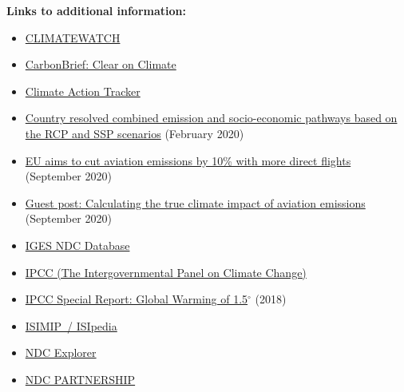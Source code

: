 \documentclass[12pt]{article}
\begin{document}
 \noindent \textbf{Links to additional information:}
 \begin{itemize}
 \item \href{https://www.climatewatchdata.org/}{CLIMATEWATCH} 
 \vspace{-.2cm} \item \href{https://www.carbonbrief.org/}{CarbonBrief: Clear on Climate} 
 \vspace{-.2cm} \item \href{https://climateactiontracker.org/}{Climate Action Tracker} 
 \vspace{-.2cm} \item \href{https://zenodo.org/record/3638137#.X2sqPIuxU2w}{Country resolved combined emission and socio-economic pathways based on the RCP and SSP scenarios} (February 2020)
 \vspace{-.2cm} \item \href{https://uk.reuters.com/article/us-airlines-eu/eu-aims-to-cut-aviation-emissions-by-10-with-more-direct-flights-idUKKCN26D1KS?utm_campaign=Carbon%20Brief%20Daily%20Briefing&utm_medium=email&utm_source=Revue%20newsletter}{EU aims to cut aviation emissions by 10\% with more direct flights} (September 2020)
 \vspace{-.2cm} \item \href{https://www.carbonbrief.org/guest-post-calculating-the-true-climate-impact-of-aviation-emissions?utm_campaign=Carbon%20Brief%20Daily%20Briefing&utm_medium=email&utm_source=Revue%20newsletter}{Guest post: Calculating the true climate impact of aviation emissions} (September 2020)
 \vspace{-.2cm} \item \href{https://www.iges.or.jp/en/pub/iges-indc-ndc-database/en}{IGES NDC Database} 
 \vspace{-.2cm} \item \href{https://www.ipcc.ch/}{IPCC (The Intergovernmental Panel on Climate Change)} 
 \vspace{-.2cm} \item \href{https://www.ipcc.ch/sr15/}{IPCC Special Report: Global Warming of 1.5$^{\circ}$} (2018)
 \vspace{-.2cm} \item \href{https://www.isimip.org/isipedia/#isipedia-portal}{ISIMIP~/ ISIpedia} 
 \vspace{-.2cm} \item \href{https://klimalog.die-gdi.de/ndc/#NDCExplorer/worldMap?NDC??income???catIncome}{NDC Explorer} 
 \vspace{-.2cm} \item \href{https://ndcpartnership.org/}{NDC PARTNERSHIP} 

\end{itemize}
\end{document}
